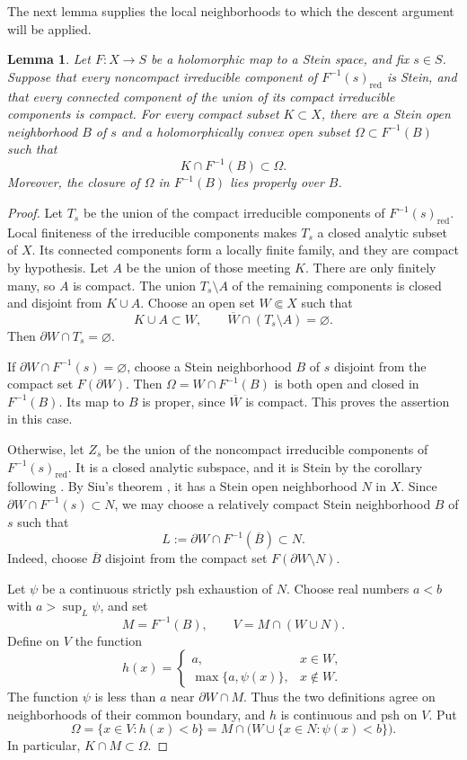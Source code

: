\documentclass[11pt]{amsart}
\newtheorem{lemma}[theorem]{Lemma}
\theoremstyle{definition}
\theoremstyle{remark}
\numberwithin{equation}{section}
\begin{document}
The next lemma supplies the local neighborhoods to which the
descent argument will be applied.

\begin{lemma}
\label{lem:fiber-neighborhood}
Let $F:X\to S$ be a holomorphic map to a Stein space,
and fix $s\in S$. Suppose that every noncompact irreducible
component of $F^{-1}(s)_{\mathrm{red}}$ is Stein, and that
every connected component of the union of its compact
irreducible components is compact.
For every compact subset $K\subset X$, there are a Stein
open neighborhood $B$ of $s$ and a holomorphically convex
open subset $\Omega\subset F^{-1}(B)$ such that
\[
 K\cap F^{-1}(B)\subset\Omega.
\]
Moreover, the closure of $\Omega$ in $F^{-1}(B)$ lies
properly over $B$.
\end{lemma}

\begin{proof}
Let $T_s$ be the union of the compact irreducible components
of $F^{-1}(s)_{\mathrm{red}}$. Local finiteness of the
irreducible components makes $T_s$ a closed analytic subset
of $X$. Its connected components form a locally finite family,
and they are compact by hypothesis.
Let $A$ be the union of those meeting $K$.
There are only finitely many, so $A$ is compact.
The union $T_s\setminus A$ of the remaining components is
closed and disjoint from $K\cup A$. Choose an open set
$W\Subset X$ such that
\[
 K\cup A\subset W,\qquad
 \overline W\cap(T_s\setminus A)=\varnothing.
\]
Then $\partial W\cap T_s=\varnothing$.

If $\partial W\cap F^{-1}(s)=\varnothing$, choose a Stein
neighborhood $B$ of $s$ disjoint from the compact set
$F(\partial W)$. Then $\Omega=W\cap F^{-1}(B)$ is both open
and closed in $F^{-1}(B)$. Its map to $B$ is proper, since
$\overline W$ is compact. This proves the assertion in this case.

Otherwise, let $Z_s$ be the union of the noncompact irreducible
components of $F^{-1}(s)_{\mathrm{red}}$.
It is a closed analytic subspace, and it is Stein by the
corollary following \cite[Theorem~1, p.~327]{Narasimhan1962}.
By Siu's theorem \cite{Siu1976}, it has a Stein open
neighborhood $N$ in $X$.
Since $\partial W\cap F^{-1}(s)\subset N$, we may choose a
relatively compact Stein neighborhood $B$ of $s$ such that
\[
 L:=\partial W\cap F^{-1}(\overline B)\subset N.
\]
Indeed, choose $\overline B$ disjoint from the compact set
$F(\partial W\setminus N)$.

Let $\psi$ be a continuous strictly psh exhaustion of $N$.
Choose real numbers $a<b$ with $a>\sup_L\psi$, and set
\[
 M=F^{-1}(B),\qquad V=M\cap(W\cup N).
\]
Define on $V$ the function
\[
 h(x)=
 \begin{cases}
 a,&x\in W,\\
 \max\{a,\psi(x)\},&x\notin W.
 \end{cases}
\]
The function $\psi$ is less than $a$ near $\partial W\cap M$.
Thus the two definitions agree on neighborhoods of their
common boundary, and $h$ is continuous and psh on $V$.
Put
\[
 \Omega=\{x\in V:h(x)<b\}
       =M\cap\bigl(W\cup\{x\in N:\psi(x)<b\}\bigr).
\]
In particular, $K\cap M\subset\Omega$.


\end{proof}
\end{document}
